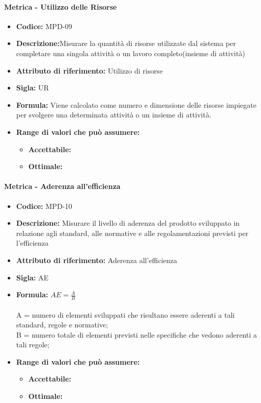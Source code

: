                \paragraph{Metrica - Utilizzo delle Risorse} 
                  \begin{itemize}
         \item   \textbf{Codice:} MPD-09
         \item   \textbf{Descrizione:}Misurare la quantità di risorse utilizzate dal sistema per completare una singola attività o un lavoro completo(insieme di attività)
          \item  \textbf{Attributo di riferimento:} Utilizzo di risorse
          \item  \textbf{Sigla:} UR
           \item \textbf{Formula:} Viene calcolato come numero e dimensione delle risorse impiegate per svolgere una determinata attività o un insieme di attività.
            \item \textbf{Range di valori che può assumere:}
        \begin{itemize}
            \item \textbf{Accettabile:} 
            \item \textbf{Ottimale:} 
        \end{itemize}
       \end{itemize}
              
      
               \paragraph{Metrica - Aderenza all'efficienza} 
                  \begin{itemize}
          \item  \textbf{Codice:} MPD-10
          \item  \textbf{Descrizione:} Misurare il livello di aderenza del prodotto sviluppato in relazione agli standard, alle normative e alle regolamentazioni previsti per l'efficienza
          \item  \textbf{Attributo di riferimento:} Aderenza all'efficienza 
          \item  \textbf{Sigla:} AE
          \item  \textbf{Formula:} \begin{math}AE = \frac{A}{B}\end{math}\\ \\
            A = numero di elementi sviluppati che risultano essere aderenti a tali standard, regole e normative;\\
            B = numero totale di elementi previsti nelle specifiche che vedono aderenti a tali regole;
          \item \textbf{Range di valori che può assumere:}
        \begin{itemize}
            \item \textbf{Accettabile:} 
            \item \textbf{Ottimale:} 
        \end{itemize}
       \end{itemize}
              
